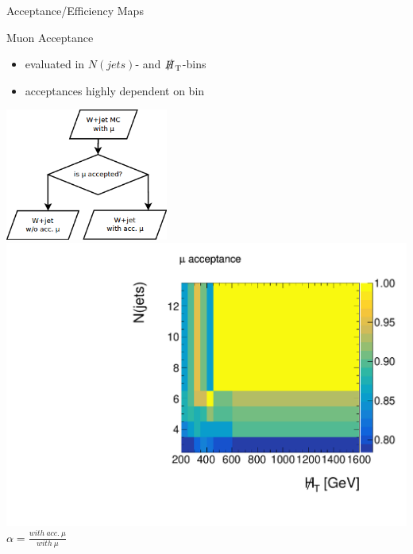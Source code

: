 

\begin{frame}{Acceptance/Efficiency Maps}

\begin{block}{Muon Acceptance}
\begin{itemize}
\item evaluated in $N(\si{jets})$- and $\slashed H_{\si{T}}$-bins
\item acceptances highly dependent on bin
\end{itemize}
\end{block}

\begin{center}
\includegraphics[width = 0.4\textwidth]{figures/MuonAcc.png}
\includegraphics[width = 0.4 \textwidth]{plots11/MuonAcceptance.pdf}\\
$\alpha = \frac{\si{with~acc.~\mu}}{\si{with~\mu}}$
\end{center}

\end{frame}


